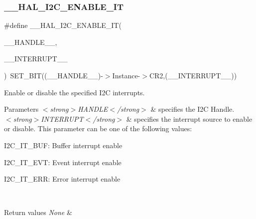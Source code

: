\subsubsection{\texorpdfstring{\+\_\+\+\_\+\+H\+A\+L\+\_\+\+I2\+C\+\_\+\+E\+N\+A\+B\+L\+E\+\_\+\+IT}{\_\_HAL\_I2C\_ENABLE\_IT}}
{\footnotesize\ttfamily \#define \+\_\+\+\_\+\+H\+A\+L\+\_\+\+I2\+C\+\_\+\+E\+N\+A\+B\+L\+E\+\_\+\+IT(\begin{DoxyParamCaption}\item[{}]{\+\_\+\+\_\+\+H\+A\+N\+D\+L\+E\+\_\+\+\_\+,  }\item[{}]{\+\_\+\+\_\+\+I\+N\+T\+E\+R\+R\+U\+P\+T\+\_\+\+\_\+ }\end{DoxyParamCaption})~S\+E\+T\+\_\+\+B\+IT((\+\_\+\+\_\+\+H\+A\+N\+D\+L\+E\+\_\+\+\_\+)-\/$>$Instance-\/$>$C\+R2,(\+\_\+\+\_\+\+I\+N\+T\+E\+R\+R\+U\+P\+T\+\_\+\+\_\+))}



Enable or disable the specified I2C interrupts. 


\begin{DoxyParams}{Parameters}
{\em $<$strong$>$\+H\+A\+N\+D\+L\+E$<$/strong$>$} & specifies the I2C Handle. \\
\hline
{\em $<$strong$>$\+I\+N\+T\+E\+R\+R\+U\+P\+T$<$/strong$>$} & specifies the interrupt source to enable or disable. This parameter can be one of the following values\+: \begin{DoxyItemize}
\item I2\+C\+\_\+\+I\+T\+\_\+\+B\+UF\+: Buffer interrupt enable \item I2\+C\+\_\+\+I\+T\+\_\+\+E\+VT\+: Event interrupt enable \item I2\+C\+\_\+\+I\+T\+\_\+\+E\+RR\+: Error interrupt enable \end{DoxyItemize}
\\
\hline
\end{DoxyParams}

\begin{DoxyRetVals}{Return values}
{\em None} & \\
\hline
\end{DoxyRetVals}
\mbox{\label{group___i2_c___exported___macros_gafbdf01a7dc3183de7af56456cab93551}} 
